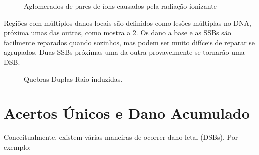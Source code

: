 \documentclass[11pt,a4paper]{article}
\newcounter{exemplo}
\begin{document}
	\begin{figure}[h]
		\centering
		\caption{Aglomerados de pares de íons causados pela radiação ionizante}
		\label{fig:spurEBlob}
	\end{figure}

	Regiões com múltiplos danos locais são definidos como lesões múltiplas no DNA, próxima umas das outras, como mostra a \ref{fig:dbsRadioInduzisd}. Os dano a base e as SSBs são facilmente reparados quando sozinhos, mas podem ser muito difíceis de reparar se agrupados. Duas SSBs próximas uma da outra provavelmente se tornarão uma DSB.

	\begin{figure}[h]
		\centering
		\caption{Quebras Duplas Raio-induzidas.}
		\label{fig:dbsRadioInduzisd}
	\end{figure}


\section{Acertos Únicos e Dano Acumulado}

	Conceitualmente, existem várias maneiras de ocorrer dano letal (DSBs). Por exemplo:
\end{document}
